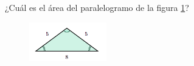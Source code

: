 \question[15]  ¿Cuál es el \'area del paralelogramo de la figura \ref{fig:area_isoseles_03}?
\begin{figure}[H]
    \begin{center}
        \includegraphics[width=0.3\textwidth]{../images/area_isoseles_03.png}
    \end{center}
    \caption{}
    \label{fig:area_isoseles_03}
\end{figure}